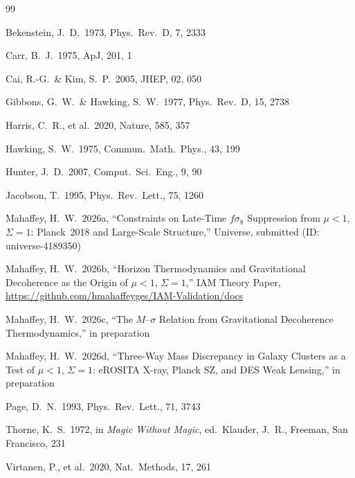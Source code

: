 \documentclass[12pt,a4paper]{article}
\begin{document}
\begin{thebibliography}{99}

 Bekenstein, J.\ D.\ 1973, Phys.\ Rev.\ D, 7, 2333

 Carr, B.\ J.\ 1975, ApJ, 201, 1

 Cai, R.-G.\ \& Kim, S.\ P.\ 2005, JHEP, 02, 050

 Gibbons, G.\ W.\ \& Hawking, S.\ W.\ 1977,
Phys.\ Rev.\ D, 15, 2738

 Harris, C.\ R., et al.\ 2020, Nature, 585, 357

 Hawking, S.\ W.\ 1975, Commun.\ Math.\ Phys., 43, 199

 Hunter, J.\ D.\ 2007, Comput.\ Sci.\ Eng., 9, 90

 Jacobson, T.\ 1995, Phys.\ Rev.\ Lett., 75, 1260

 Mahaffey, H.\ W.\ 2026a, ``Constraints on Late-Time
$f\sigma_8$ Suppression from $\mu < 1$, $\Sigma = 1$: Planck~2018 and
Large-Scale Structure,'' Universe, submitted (ID: universe-4189350)

 Mahaffey, H.\ W.\ 2026b, ``Horizon Thermodynamics
and Gravitational Decoherence as the Origin of $\mu < 1$, $\Sigma = 1$,''
IAM Theory Paper, \url{https://github.com/hmahaffeyges/IAM-Validation/docs}

 Mahaffey, H.\ W.\ 2026c, ``The $M$--$\sigma$ Relation
from Gravitational Decoherence Thermodynamics,'' in preparation

 Mahaffey, H.\ W.\ 2026d, ``Three-Way Mass Discrepancy
in Galaxy Clusters as a Test of $\mu < 1$, $\Sigma = 1$: eROSITA X-ray, Planck
SZ, and DES Weak Lensing,'' in preparation

 Page, D.\ N.\ 1993, Phys.\ Rev.\ Lett., 71, 3743

 Thorne, K.\ S.\ 1972, in \textit{Magic Without Magic},
ed.\ Klauder, J.\ R., Freeman, San Francisco, 231

 Virtanen, P., et al.\ 2020, Nat.\ Methods, 17, 261

\end{thebibliography}
\end{document}
